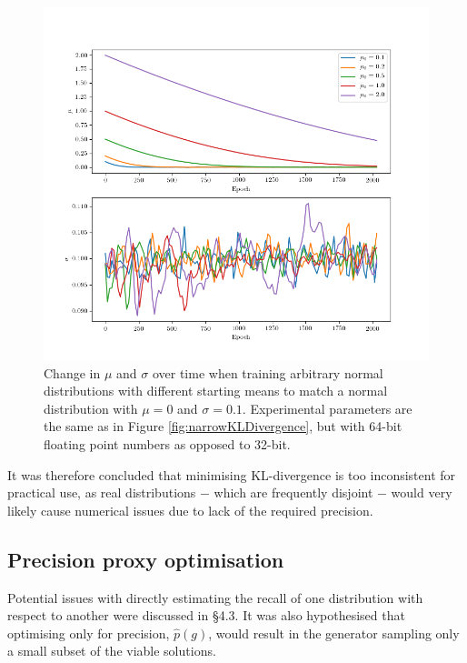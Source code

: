\documentclass[../../main.tex]{subfiles}
\begin{document}
\begin{figure}
    \begin{center}
    \includegraphics[width=\textwidth]{narrowKLDivergenceFloat64}
    \caption{
        Change in $\mu$ and $\sigma$ over time when training arbitrary normal distributions with different starting means to match a normal distribution with $\mu=0$ and $\sigma=0.1$. 
        Experimental parameters are the same as in Figure \ref{fig:narrowKLDivergence}, but with 64-bit floating point numbers as opposed to 32-bit.
    }
    \label{fig:narrowKLDivergenceFloat64}
    \end{center}
\end{figure}

It was therefore concluded that minimising KL-divergence is too inconsistent for practical use, as real distributions $-$ which are frequently disjoint $-$ would very likely cause numerical issues due to lack of the required precision.

\subsection{Precision proxy optimisation}

Potential issues with directly estimating the recall of one distribution with respect to another were discussed in \S 4.3.
It was also hypothesised that optimising only for precision, $\hat{p}(g)$, would result in the generator sampling only a small subset of the viable solutions.
\end{document}
